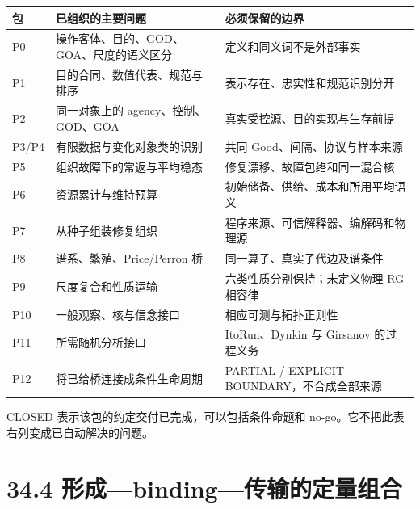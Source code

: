 \documentclass[
  11pt,
  oneside]{book}
\newcounter{none} %
\begin{document}
{\def\LTcaptype{none} %
\begin{longtable}[]{@{}
  >{\raggedright\arraybackslash}p{}
  >{\raggedright\arraybackslash}p{}
  >{\raggedright\arraybackslash}p{}@{}}
\toprule\noalign{}
\begin{minipage}[b]{\linewidth}\raggedright
包
\end{minipage} & \begin{minipage}[b]{\linewidth}\raggedright
已组织的主要问题
\end{minipage} & \begin{minipage}[b]{\linewidth}\raggedright
必须保留的边界
\end{minipage} \\
\midrule\noalign{}
\endhead
\bottomrule\noalign{}
\endlastfoot
P0 & 操作客体、目的、GOD、GOA、尺度的语义区分 & 定义和同义词不是外部事实 \\
P1 & 目的合同、数值代表、规范与排序 & 表示存在、忠实性和规范识别分开 \\
P2 & 同一对象上的 agency、控制、GOD、GOA & 真实受控源、目的实现与生存前提 \\
P3/P4 & 有限数据与变化对象类的识别 & 共同 Good、间隔、协议与样本来源 \\
P5 & 组织故障下的常返与平均稳态 & 修复漂移、故障包络和同一混合核 \\
P6 & 资源累计与维持预算 & 初始储备、供给、成本和所用平均语义 \\
P7 & 从种子组装修复组织 & 程序来源、可信解释器、编解码和物理源 \\
P8 & 谱系、繁殖、Price/Perron 桥 & 同一算子、真实子代边及谱条件 \\
P9 & 尺度复合和性质运输 & 六类性质分别保持；未定义物理 RG 相容律 \\
P10 & 一般观察、核与信念接口 & 相应可测与拓扑正则性 \\
P11 & 所需随机分析接口 & ItoRun、Dynkin 与 Girsanov 的过程义务 \\
P12 & 将已给桥连接成条件生命周期 & PARTIAL / EXPLICIT BOUNDARY，不合成全部来源 \\
\end{longtable}
}

CLOSED 表示该包的约定交付已完成，可以包括条件命题和 no-go。它不把此表右列变成已自动解决的问题。

\section{34.4 形成---binding---传输的定量组合}\label{ux5f62ux6210bindingux4f20ux8f93ux7684ux5b9aux91cfux7ec4ux5408}
\end{document}
